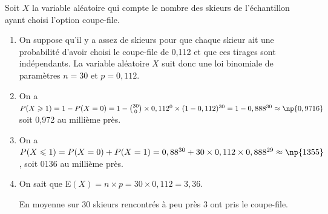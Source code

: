 Soit $X$ la variable aléatoire qui compte le nombre des skieurs de l'échantillon ayant
choisi l'option coupe-file.

\medskip

\begin{enumerate}
\item %
On suppose qu'il y a assez de skieurs pour que chaque skieur ait une probabilité d'avoir choisi le coupe-file de 0,112 et que ces tirages sont indépendants. La variable aléatoire $X$ suit donc une loi binomiale de paramètres $n = 30$ et $p = 0,112$. 
\item %
On a $P(X \geqslant 1) = 1 - P(X = 0) = 1 - \binom{30}{0} \times 0,112^0 \times (1 - 0,112)^{30} = 1 - 0,888^{30} \approx \np{0,9716}$ soit 0,972 au millième près.
\item %
On a $P(X \leqslant 1) = P(X = 0) + P(X = 1) = 0,88^{30} + 30 \times 0,112 \times 0,888^{29} \approx \np{1355}$, soit 0136 au millième près.

\item %
On sait que E$(X) = n \times p = 30 \times 0,112 = 3,36$.

En moyenne sur 30 skieurs rencontrés à peu près 3 ont pris le coupe-file.
\end{enumerate}

\bigskip

